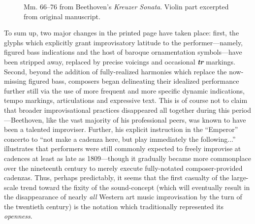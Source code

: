     
        \begin{figure}
            \centering
            \captionsetup{width=.5\textwidth}
            \caption[Mm. 66--76 from Beethoven's \textit{Kreuzer Sonata}. Violin part excerpted from original manuscript.]{Mm. 66--76 from Beethoven's \textit{Kreuzer Sonata}. Violin part excerpted from original manuscript.\footnotemark}
            \label{fig:beethoven}
        \end{figure}

    To sum up, two major changes in the printed page have taken place: first, the glyphs which explicitly grant improvisatory latitude to the performer---namely, figured bass indications and the host of baroque ornamentation symbols---have been stripped away, replaced by precise voicings and occasional \textbf{\textit{tr}} markings. Second, beyond the addition of fully-realized harmonies which replace the now-missing figured bass, composers began delineating their idealized performance further still via the use of more frequent and more specific dynamic indications, tempo markings, articulations and expressive text. This is of course not to claim that broader improvisational practices disappeared all together during this period---Beethoven, like the vast majority of his professional peers, was known to have been a talented improviser.\autocite[652-3]{Taruskin_2009b} Further, his explicit instruction in the ``Emperor'' concerto to ``not make a cadenza here, but play immediately the following...'' illustrates that performers were still commonly expected to freely improvise at cadences at least as late as 1809---though it gradually became more commonplace over the nineteenth century to merely execute fully-notated composer-provided cadenzas.\autocite[45]{Swain_1988} Thus, perhaps predictably, it seems that the first casualty of the large-scale trend toward the fixity of the sound-concept (which will eventually result in the disappearance of nearly \textit{all} Western art music improvisation by the turn of the twentieth century) is the notation which traditionally represented its \textit{openness}.
    
